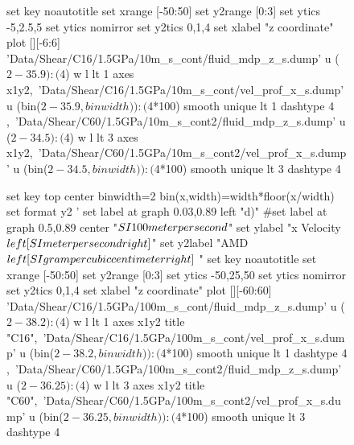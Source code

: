 \documentclass[aps,prb,reprint,superscriptaddress, a4paper]{revtex4-1}
\begin{document}
\begin{figure}[h]
\begin{center}
\begin{gnuplot}[terminal=pdf, terminaloptions={size \SERFigwidth cm, \SERFigheight cm color solid}]
			set key noautotitle
			set xrange [-50:50]
			set y2range [0:3]
			set ytics  -5,2.5,5
			set ytics nomirror
			set y2tics 0,1,4
			set xlabel "z coordinate"  
			plot  	[][-6:6]  'Data/Shear/C16/1.5GPa/10m_s_cont/fluid_mdp_z_s.dump' u ($2-35.9):($4) w l  lt 1 axes x1y2,\
				              'Data/Shear/C16/1.5GPa/10m_s_cont/vel_prof_x_s.dump'  u (bin($2-35.9,binwidth)):($4*100) smooth unique lt 1 dashtype 4 ,\	
                              'Data/Shear/C60/1.5GPa/10m_s_cont2/fluid_mdp_z_s.dump' u ($2-34.5):($4) w l  lt 3  axes x1y2,\
				              'Data/Shear/C60/1.5GPa/10m_s_cont2/vel_prof_x_s.dump'  u (bin($2-34.5,binwidth)):($4*100) smooth unique lt 3 dashtype 4 
		\end{gnuplot}
		\begin{gnuplot}[terminal=pdf, terminaloptions={size \SERFigwidth cm, \SERFigheight cm color solid}]
		set key top center
			binwidth=2
			bin(x,width)=width*floor(x/width)
			set format y2 '%
			set label at graph 0.03,0.89 left "d)"
			#set label at graph 0.5,0.89 center "$\\SI{100}{\\meter\\per\\second}$"
			set ylabel "x Velocity $\\left[ \\SI{}{\\meter\\per\\second} \\right]$"
			set y2label "AMD $\\left[ \\SI{}{\\gram\\per\\cubic\\centi\\meter} \\right]$ "
			set key noautotitle
			set xrange [-50:50]
			set y2range [0:3]
			set ytics  -50,25,50
			set ytics nomirror
			set y2tics 0,1,4
			set xlabel "z coordinate"  
			plot  	[][-60:60]  'Data/Shear/C16/1.5GPa/100m_s_cont/fluid_mdp_z_s.dump' u ($2-38.2):($4) w l  lt 1 axes x1y2 title "C16",\
				              'Data/Shear/C16/1.5GPa/100m_s_cont/vel_prof_x_s.dump'  u (bin($2-38.2,binwidth)):($4*100) smooth unique lt 1 dashtype 4 ,\
                              'Data/Shear/C60/1.5GPa/100m_s_cont2/fluid_mdp_z_s.dump' u ($2-36.25):($4) w l  lt 3  axes x1y2 title "C60",\
				              'Data/Shear/C60/1.5GPa/100m_s_cont2/vel_prof_x_s.dump'  u (bin($2-36.25,binwidth)):($4*100) smooth unique lt 3 dashtype 4 
		\end{gnuplot}
		

\end{center}
\end{figure}
\end{document}
